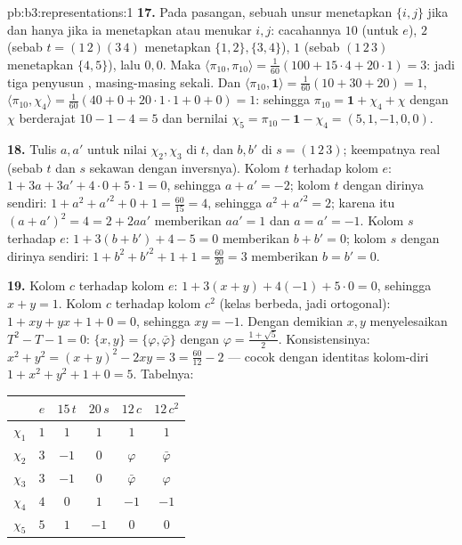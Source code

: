 \begin{solution}{pb:b3:representations:1}
\textbf{17.} Pada pasangan, sebuah unsur menetapkan $\{i,j\}$ jika dan hanya jika ia menetapkan
atau menukar $i, j$: cacahannya $10$ (untuk $e$), $2$ (sebab $t =
(1\,2)(3\,4)$ menetapkan $\{1,2\}, \{3,4\}$), $1$ (sebab $(1\,2\,3)$
menetapkan $\{4,5\}$), lalu $0, 0$. Maka $\langle\pi_{10},
\pi_{10}\rangle = \frac1{60}(100 + 15\cdot4 + 20\cdot1) = 3$:
jadi tiga penyusun , masing-masing sekali. Dan
$\langle\pi_{10}, \mathbf 1\rangle = \frac1{60}(10 + 30 + 20)
= 1$, $\langle\pi_{10}, \chi_4\rangle = \frac1{60}(40 + 0 +
20\cdot1\cdot1 + 0 + 0) = 1$: sehingga $\pi_{10} = \mathbf 1 + \chi_4
+ \chi$ dengan $\chi$  berderajat $10 - 1 - 4 = 5$ dan
bernilai $\chi_5 = \pi_{10} - \mathbf 1 - \chi_4 = (5, 1, -1, 0,
0)$.

\textbf{18.} Tulis $a, a'$ untuk nilai $\chi_2, \chi_3$
di $t$, dan $b, b'$ di $s = (1\,2\,3)$; keempatnya real (sebab $t$
dan $s$ sekawan dengan inversnya). Kolom $t$ terhadap
kolom $e$: $1 + 3a + 3a' + 4\cdot0 + 5\cdot1 = 0$, sehingga $a + a'
= -2$; kolom $t$ dengan dirinya sendiri: $1 + a^2 + a'^2 + 0 + 1 =
\frac{60}{15} = 4$, sehingga $a^2 + a'^2 = 2$; karena itu $(a + a')^2 = 4
= 2 + 2aa'$ memberikan $aa' = 1$ dan $a = a' = -1$. Kolom $s$
terhadap $e$: $1 + 3(b + b') + 4 - 5 = 0$ memberikan $b + b' = 0$;
kolom $s$ dengan dirinya sendiri: $1 + b^2 + b'^2 + 1 + 1 = \frac{60}
{20} = 3$ memberikan $b = b' = 0$.

\textbf{19.} Kolom $c$ terhadap kolom $e$: $1 + 3(x + y) +
4(-1) + 5\cdot0 = 0$, sehingga $x + y = 1$. Kolom $c$ terhadap
kolom $c^2$ (kelas berbeda, jadi ortogonal): $1 + xy + yx + 1
+ 0 = 0$, sehingga $xy = -1$. Dengan demikian $x, y$ menyelesaikan $T^2 - T - 1 = 0$:
$\{x, y\} = \{\varphi, \bar\varphi\}$ dengan $\varphi = \frac{1 +
\sqrt5}2$. Konsistensinya: $x^2 + y^2 = (x+y)^2 - 2xy = 3 =
\frac{60}{12} - 2$ --- cocok dengan identitas kolom-diri $1 +
x^2 + y^2 + 1 + 0 = 5$. Tabelnya:
\begin{center}
\begin{tabular}{c|ccccc}
 & $e$ & $15\,t$ & $20\,s$ & $12\,c$ & $12\,c^2$\\
\hline
$\chi_1$ & $1$ & $1$ & $1$ & $1$ & $1$\\
$\chi_2$ & $3$ & $-1$ & $0$ & $\varphi$ & $\bar\varphi$\\
$\chi_3$ & $3$ & $-1$ & $0$ & $\bar\varphi$ & $\varphi$\\
$\chi_4$ & $4$ & $0$ & $1$ & $-1$ & $-1$\\
$\chi_5$ & $5$ & $1$ & $-1$ & $0$ & $0$\\
\end{tabular}
\end{center}


\end{solution}

